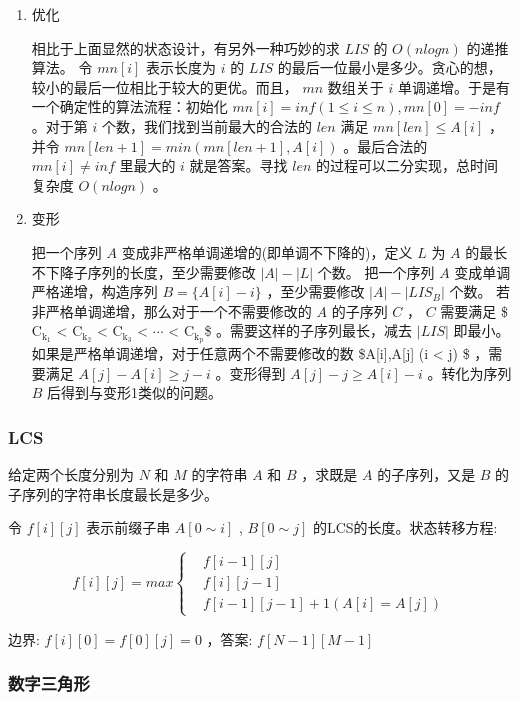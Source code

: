 \documentclass[11pt]{article}
\begin{document}
\begin{enumerate}
\item 优化
\label{sec-2-3-1-1}

相比于上面显然的状态设计，有另外一种巧妙的求 $LIS$ 的 $O(nlogn)$ 的递推算法。
令 $mn[i]$ 表示长度为 $i$ 的 $LIS$ 的最后一位最小是多少。贪心的想，较小的最后一位相比于较大的更优。而且， $mn$ 数组关于 $i$ 单调递增。于是有一个确定性的算法流程：初始化 $mn[i]=inf(1 \leq i \leq n),mn[0]=-inf$ 。对于第 $i$ 个数，我们找到当前最大的合法的 $len$ 满足 $mn[len] \leq A[i]$ ，并令 $mn[len+1]=min(mn[len+1],A[i])$ 。最后合法的 $mn[i] \neq inf$ 里最大的 $i$ 就是答案。寻找 $len$ 的过程可以二分实现，总时间复杂度 $O(nlogn)$ 。

\item 变形
\label{sec-2-3-1-2}

把一个序列 $A$ 变成非严格单调递增的(即单调不下降的)，定义 $L$ 为 $A$ 的最长不下降子序列的长度，至少需要修改 $|A|-|{L}|$ 个数。
把一个序列 $A$ 变成单调严格递增，构造序列 $B=\{A[i]-i\}$ ，至少需要修改 $|A|-|{LIS_B}|$ 个数。
若非严格单调递增，那么对于一个不需要修改的 $A$ 的子序列 $C$ ， $C$  需要满足 \$ C$_{\text{k}_{\text{1}}}$ < C$_{\text{k}_{\text{2}}}$ < C$_{\text{k}_{\text{3}}}$ < $\cdots{}$ < C$_{\text{k}_{\text{p}}}$\$ 。需要这样的子序列最长，减去 $|LIS|$ 即最小。如果是严格单调递增，对于任意两个不需要修改的数 \$A[i],A[j] (i < j) \$ ，需要满足 $A[j]-A[i] \geq j-i$ 。变形得到 $A[j]-j \geq A[i]-i$ 。转化为序列 $B$ 后得到与变形1类似的问题。
\end{enumerate}
\subsubsection{LCS}
\label{sec-2-3-2}

给定两个长度分别为 $N$ 和 $M$ 的字符串 $A$ 和 $B$ ，求既是 $A$ 的子序列，又是 $B$ 的子序列的字符串长度最长是多少。

令 $f[i][j]$ 表示前缀子串 $A[0 \sim i]$ , $B[0 \sim j]$ 的LCS的长度。状态转移方程:

$$ 
f[i][j]=max\left\{\begin{aligned}
&f[i-1][j]\\
&f[i][j-1]\\
&f[i-1][j-1]+1 (A[i]=A[j])
\end{aligned}\right. 
$$

边界: $f[i][0]=f[0][j]=0$ ，答案: $f[N-1][M-1]$ 
\subsubsection{数字三角形}
\label{sec-2-3-3}
\end{document}

